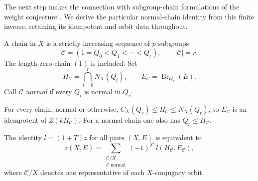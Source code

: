 The next step makes the connection with subgroup-chain formulations of
the weight conjecture \cite{KnorrRobinson1989}. We derive the particular
normal-chain identity from this finite inverse, retaining its idempotent
and orbit data throughout.

\begin{definition}[Chains]\label{def:p-chains}
A chain in $X$ is a strictly increasing sequence of $p$-subgroups
\[
 \mathcal C=(1=Q_0<Q_1<\cdots<Q_r),
 \qquad |\mathcal C|=r.
\]
The length-zero chain $(1)$ is included. Set
\[
 H_{\mathcal C}=\bigcap_{i=0}^rN_X(Q_i),
 \qquad E_{\mathcal C}=\operatorname{Br}_{Q_r}(E).
\]
Call $\mathcal C$ \emph{normal} if every $Q_i$ is normal in $Q_r$.
\end{definition}

For every chain, normal or otherwise,
$C_X(Q_r)\leq H_{\mathcal C}\leq N_X(Q_r)$, so
$E_{\mathcal C}$ is an idempotent of $Z(kH_{\mathcal C})$.
For a normal chain one also has $Q_r\leq H_{\mathcal C}$.

\begin{lemma}\label{lem:chain-transform}
The identity $l=(1+T)z$ for all pairs $(X,E)$ is equivalent to
\begin{equation}\label{eq:chain-inversion}
 z(X,E)=
 \sum_{\substack{\mathcal C/X\\\mathcal C\ \mathrm{normal}}}
 (-1)^{|\mathcal C|}l(H_{\mathcal C},E_{\mathcal C}),
\end{equation}
where $\mathcal C/X$ denotes one representative of each
$X$-conjugacy orbit.
\end{lemma}

